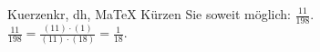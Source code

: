 \begin{MAufgabe}{Kuerzen}{kr, dh, MaTeX}
K\"urzen Sie soweit m\"oglich: $\frac{11}{198}$.\\ 
\ifLsg\MLoesung
\quad $\frac{11}{198}=\frac{(11)\cdot(1)}{(11)\cdot(18)}=\frac{1}{18}$.\else\relax\fi
 \end{MAufgabe}